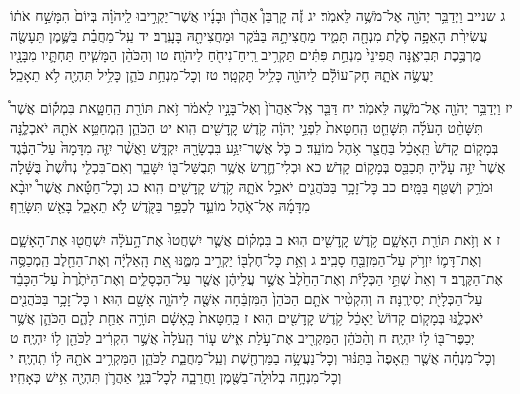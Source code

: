 \documentclass[twoside, openany, parskip=half, 11pt]{book}
\begin{document}
ג שנייב וַיְדַבֵּ֥ר יְהֹוָ֖ה אֶל־מֹשֶׁ֥ה לֵּאמֹֽר׃ יג זֶ֡ה קׇרְבַּן֩ אַהֲרֹ֨ן וּבָנָ֜יו אֲשֶׁר־יַקְרִ֣יבוּ לַֽיהֹוָ֗ה בְּיוֹם֙ הִמָּשַׁ֣ח אֹת֔וֹ עֲשִׂירִ֨ת הָאֵפָ֥ה סֹ֛לֶת מִנְחָ֖ה תָּמִ֑יד מַחֲצִיתָ֣הּ בַּבֹּ֔קֶר וּמַחֲצִיתָ֖הּ בָּעָֽרֶב׃ יד עַֽל־מַחֲבַ֗ת בַּשֶּׁ֛מֶן תֵּעָשֶׂ֖ה מֻרְבֶּ֣כֶת תְּבִיאֶ֑נָּה תֻּפִינֵי֙ מִנְחַ֣ת פִּתִּ֔ים תַּקְרִ֥יב רֵֽיחַ־נִיחֹ֖חַ לַיהֹוָֽה׃ טו וְהַכֹּהֵ֨ן הַמָּשִׁ֧יחַ תַּחְתָּ֛יו מִבָּנָ֖יו יַעֲשֶׂ֣ה אֹתָ֑הּ חׇק־עוֹלָ֕ם לַיהֹוָ֖ה כָּלִ֥יל תׇּקְטָֽר׃ טז וְכׇל־מִנְחַ֥ת כֹּהֵ֛ן כָּלִ֥יל תִּהְיֶ֖ה לֹ֥א תֵאָכֵֽל׃

יז וַיְדַבֵּ֥ר יְהֹוָ֖ה אֶל־מֹשֶׁ֥ה לֵּאמֹֽר׃ יח דַּבֵּ֤ר אֶֽל־אַהֲרֹן֙ וְאֶל־בָּנָ֣יו לֵאמֹ֔ר זֹ֥את תּוֹרַ֖ת הַֽחַטָּ֑את בִּמְק֡וֹם אֲשֶׁר֩ תִּשָּׁחֵ֨ט הָעֹלָ֜ה תִּשָּׁחֵ֤ט הַֽחַטָּאת֙ לִפְנֵ֣י יְהֹוָ֔ה קֹ֥דֶשׁ קׇֽדָשִׁ֖ים הִֽוא׃ יט הַכֹּהֵ֛ן הַֽמְחַטֵּ֥א אֹתָ֖הּ יֹאכְלֶ֑נָּה בְּמָק֤וֹם קָדֹשׁ֙ תֵּֽאָכֵ֔ל בַּחֲצַ֖ר אֹ֥הֶל מוֹעֵֽד׃ כ כֹּ֛ל אֲשֶׁר־יִגַּ֥ע בִּבְשָׂרָ֖הּ יִקְדָּ֑שׁ וַאֲשֶׁ֨ר יִזֶּ֤ה מִדָּמָהּ֙ עַל־הַבֶּ֔גֶד אֲשֶׁר֙ יִזֶּ֣ה עָלֶ֔יהָ תְּכַבֵּ֖ס בְּמָק֥וֹם קָדֹֽשׁ׃ כא וּכְלִי־חֶ֛רֶשׂ אֲשֶׁ֥ר תְּבֻשַּׁל־בּ֖וֹ יִשָּׁבֵ֑ר וְאִם־בִּכְלִ֤י נְחֹ֙שֶׁת֙ בֻּשָּׁ֔לָה וּמֹרַ֥ק וְשֻׁטַּ֖ף בַּמָּֽיִם׃ כב כׇּל־זָכָ֥ר בַּכֹּהֲנִ֖ים יֹאכַ֣ל אֹתָ֑הּ קֹ֥דֶשׁ קׇֽדָשִׁ֖ים הִֽוא׃ כג וְכׇל־חַטָּ֡את אֲשֶׁר֩ יוּבָ֨א מִדָּמָ֜הּ אֶל־אֹ֧הֶל מוֹעֵ֛ד לְכַפֵּ֥ר בַּקֹּ֖דֶשׁ לֹ֣א תֵאָכֵ֑ל בָּאֵ֖שׁ תִּשָּׂרֵֽף׃

ז א וְזֹ֥את תּוֹרַ֖ת הָאָשָׁ֑ם קֹ֥דֶשׁ קׇֽדָשִׁ֖ים הֽוּא׃ ב בִּמְק֗וֹם אֲשֶׁ֤ר יִשְׁחֲטוּ֙ אֶת־הָ֣עֹלָ֔ה יִשְׁחֲט֖וּ אֶת־הָאָשָׁ֑ם וְאֶת־דָּמ֛וֹ יִזְרֹ֥ק עַל־הַמִּזְבֵּ֖חַ סָבִֽיב׃ ג וְאֵ֥ת כׇּל־חֶלְבּ֖וֹ יַקְרִ֣יב מִמֶּ֑נּוּ אֵ֚ת הָֽאַלְיָ֔ה וְאֶת־הַחֵ֖לֶב הַֽמְכַסֶּ֥ה אֶת־הַקֶּֽרֶב׃ ד וְאֵת֙ שְׁתֵּ֣י הַכְּלָיֹ֔ת וְאֶת־הַחֵ֙לֶב֙ אֲשֶׁ֣ר עֲלֵיהֶ֔ן אֲשֶׁ֖ר עַל־הַכְּסָלִ֑ים וְאֶת־הַיֹּתֶ֙רֶת֙ עַל־הַכָּבֵ֔ד עַל־הַכְּלָיֹ֖ת יְסִירֶֽנָּה׃ ה וְהִקְטִ֨יר אֹתָ֤ם הַכֹּהֵן֙ הַמִּזְבֵּ֔חָה אִשֶּׁ֖ה לַיהֹוָ֑ה אָשָׁ֖ם הֽוּא׃ ו כׇּל־זָכָ֥ר בַּכֹּהֲנִ֖ים יֹאכְלֶ֑נּוּ בְּמָק֤וֹם קָדוֹשׁ֙ יֵאָכֵ֔ל קֹ֥דֶשׁ קׇֽדָשִׁ֖ים הֽוּא׃ ז כַּֽחַטָּאת֙ כָּֽאָשָׁ֔ם תּוֹרָ֥ה אַחַ֖ת לָהֶ֑ם הַכֹּהֵ֛ן אֲשֶׁ֥ר יְכַפֶּר־בּ֖וֹ ל֥וֹ יִהְיֶֽה׃ ח וְהַ֨כֹּהֵ֔ן הַמַּקְרִ֖יב אֶת־עֹ֣לַת אִ֑ישׁ ע֤וֹר הָֽעֹלָה֙ אֲשֶׁ֣ר הִקְרִ֔יב לַכֹּהֵ֖ן ל֥וֹ יִהְיֶֽה׃ ט וְכׇל־מִנְחָ֗ה אֲשֶׁ֤ר תֵּֽאָפֶה֙ בַּתַּנּ֔וּר וְכׇל־נַעֲשָׂ֥ה בַמַּרְחֶ֖שֶׁת וְעַֽל־מַחֲבַ֑ת לַכֹּהֵ֛ן הַמַּקְרִ֥יב אֹתָ֖הּ ל֥וֹ תִֽהְיֶֽה׃ י וְכׇל־מִנְחָ֥ה בְלוּלָֽה־בַשֶּׁ֖מֶן וַחֲרֵבָ֑ה לְכׇל־בְּנֵ֧י אַהֲרֹ֛ן תִּהְיֶ֖ה אִ֥ישׁ כְּאָחִֽיו׃
\end{document}
